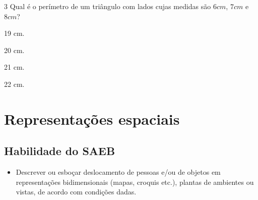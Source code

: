 \num{3} Qual é o perímetro de um triângulo com lados cujas medidas são $6 cm$,
$7 cm$ e $8 cm$?

\begin{escolha}[itemsep=0pt]
\item 19 cm.
\item 20 cm.
\item 21 cm.
\item 22 cm.
\end{escolha}














\chapter{Representações espaciais}

\section*{Habilidade do SAEB}

\begin{itemize}
  \item Descrever ou esboçar deslocamento de pessoas e/ou de objetos em
representações bidimensionais (mapas, croquis etc.), plantas de
ambientes ou vistas, de acordo com condições dadas.
\end{itemize}



